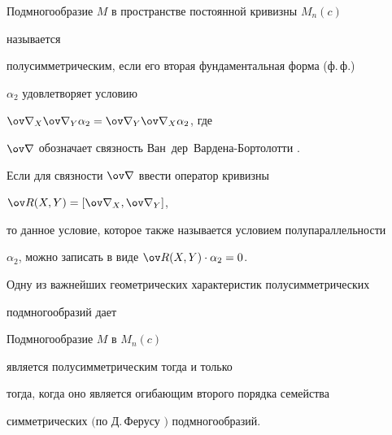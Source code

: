  


 




 


\maketitle 


\label{begin} 


 


Подмногообразие $M$ в пространстве постоянной кривизны $M_n(c)$ 


называется 


полусимметрическим, если его вторая фундаментальная форма (ф.\,ф.) 


$\alpha_2$ удовлетворяет условию 


$\ov\nabla_X\ov\nabla_Y\alpha_2=\ov\nabla_Y\ov\nabla_X\alpha_2$, где 


$\ov\nabla$ обозначает связность Ван~дер~Вардена-Бортолотти \cite{1}.


Если для связности $\ov\nabla$ ввести оператор кривизны 


$\ov R(X,Y)=[\ov\nabla_X,\ov\nabla_Y]$, 


то данное условие, которое также называется условием полупараллельности 


$\alpha_2$, можно записать в виде $\ov R(X,Y)\cdot\alpha_2=0$. 


 


Одну из важнейших геометрических характеристик полусимметрических 


подмногообразий дает


 


\begin{thm} 


Подмногообразие $M$ в $M_n(c)$ 


является полусимметрическим тогда и только 


тогда, когда оно является огибающим второго порядка семейства 


симметрических $($по Д.\,Ферусу \cite{2}$)$ подмногообразий. 


\end{thm} 


 


